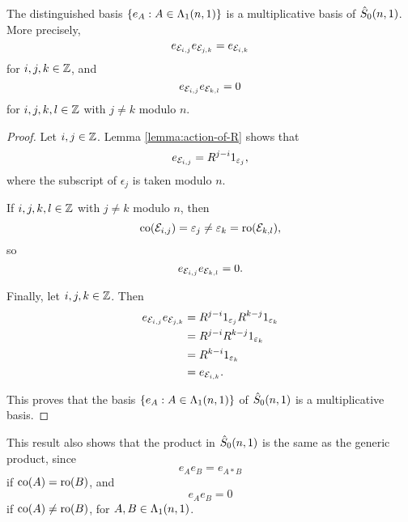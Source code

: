 \documentclass[a4paper, 11pt]{report}
\begin{document}
\begin{lemma}\label{lemma:multiplicative-basis-rank-1}
The distinguished basis $\{e_A:A\in\matrices[(n,1)]\}$ is a multiplicative basis of $\zeroschur[n,1]$. More precisely,
\begin{equation*}
e_{\elem{i}{j}}e_{\elem{j}{k}} = e_{\elem{i}{k}}
\end{equation*}
for $i,j,k\in\integers$, and
\begin{equation*}
e_{\elem{i}{j}} e_{\elem{k}{l}} = 0
\end{equation*}
for $i,j,k,l\in\integers$ with $j\neq k$ modulo $n$.
\end{lemma}

\begin{proof}
Let $i,j\in\integers$. Lemma \ref{lemma:action-of-R} shows that
\begin{equation*}
e_{\elem{i}{j}} = R^{j-i} 1_{\epsilon_j},
\end{equation*}
where the subscript of $\epsilon_j$ is taken modulo $n$.

If $i,j,k,l\in\integers$ with $j\neq k$ modulo $n$, then
\begin{equation*}
\co{\elem{i}{j}} = \epsilon_j \neq \epsilon_k = \ro{\elem{k}{l}},
\end{equation*}
so
\begin{equation*}
e_{\elem{i}{j}}e_{\elem{k}{l}} = 0.
\end{equation*}

Finally, let $i,j,k\in\integers$. Then
\begin{align*}
e_{\elem{i}{j}} e_{\elem{j}{k}} &= R^{j-i} 1_{\epsilon_j} R^{k-j} 1_{\epsilon_k}\\
&= R^{j-i}R^{k-j} 1_{\epsilon_k}\\
&= R^{k-i} 1_{\epsilon_k}\\
&= e_{\elem{i}{k}}.
\end{align*}

This proves that the basis $\{e_A:A\in\matrices[(n,1)]\}$ of $\zeroschur[n,1]$ is a multiplicative basis.
\end{proof}

This result also shows that the product in $\zeroschur[n,1]$ is the same as the generic product, since
\begin{equation*}
e_A e_B = e_{A\ast B}
\end{equation*}
if $\co{A}=\ro{B}$, and
\begin{equation*}
e_A e_B = 0
\end{equation*}
if $\co{A}\neq\ro{B}$, for $A,B\in\matrices[(n,1)]$.
\end{document}
